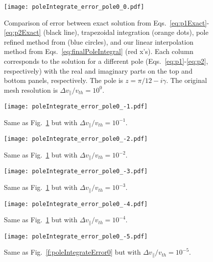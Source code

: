 \begin{figure}[!htb]
	\texttt{[image: poleIntegrate\_error\_pole0\_0.pdf]}
	\caption{Comparison of error between exact solution from Eqs.~\ref{eq:p1Exact}-\ref{eq:p2Exact} (black line),
		trapezoidal integration (orange dots),
		pole refined method from \cite{longley2024} (blue circles),
		and our linear interpolation method from Eqs.~\ref{eq:finalPoleIntegral} (red x's).
		Each column corresponds to the solution for a different pole (Eqs.~\ref{eq:p1}-\ref{eq:p2}, respectively)
		with the real and imaginary parts on the top and bottom panels, respectively.
		The pole is $z=\pi/12-i\gamma$.
		The original mesh resolution is $\Delta v_\parallel/v_{th}=10^0$.}
	\label{f:poleIntegrateError0_pole0}
\end{figure}

\begin{figure}[!htb]
	\texttt{[image: poleIntegrate\_error\_pole0\_-1.pdf]}
	\caption{Same as Fig.~\ref{f:poleIntegrateError0_pole0} but with $\Delta v_\parallel/v_{th}=10^{-1}$.}
	\label{f:poleIntegrateError-1_pole0}
\end{figure}

\begin{figure}[!htb]
	\texttt{[image: poleIntegrate\_error\_pole0\_-2.pdf]}
	\caption{Same as Fig.~\ref{f:poleIntegrateError0_pole0} but with $\Delta v_\parallel/v_{th}=10^{-2}$.}
	\label{f:poleIntegrateError-2_pole0}
\end{figure}

\begin{figure}[!htb]
	\texttt{[image: poleIntegrate\_error\_pole0\_-3.pdf]}
	\caption{Same as Fig.~\ref{f:poleIntegrateError0_pole0} but with $\Delta v_\parallel/v_{th}=10^{-3}$.}
	\label{f:poleIntegrateError-3_pole0}
\end{figure}

\begin{figure}[!htb]
	\texttt{[image: poleIntegrate\_error\_pole0\_-4.pdf]}
	\caption{Same as Fig.~\ref{f:poleIntegrateError0_pole0} but with $\Delta v_\parallel/v_{th}=10^{-4}$.}
	\label{f:poleIntegrateError-4_pole0}
\end{figure}

\begin{figure}[!htb]
	\texttt{[image: poleIntegrate\_error\_pole0\_-5.pdf]}
	\caption{Same as Fig.~\ref{f:poleIntegrateError0} but with $\Delta v_\parallel/v_{th}=10^{-5}$.}
	\label{f:poleIntegrateError-5_pole0}
\end{figure}


